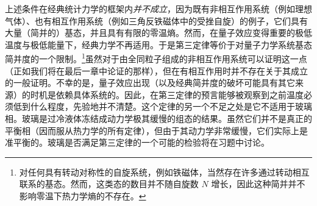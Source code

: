上述条件在经典统计力学的框架内\emph{并不成立}，因为既有非相互作用系统（例如理想气体）、也有相互作用系统（例如三角反铁磁体中的受挫自旋）的例子，它们具有大量（简并的）基态，并且具有有限的零温熵。然而，在量子效应变得重要的极低温度与极低能量下，经典力学不再适用。于是第三定律等价于对量子力学系统基态简并度的一个限制。\footnote{对任何具有转动对称性的自旋系统，例如铁磁体，当然存在许多通过转动相互联系的基态。然而，这类态的数目并不随自旋数 $N$ 增长，因此这种简并并不影响零温下热力学熵的不存在。}虽然对于由全同粒子组成的非相互作用系统可以证明这一点（正如我们将在最后一章中论证的那样），但在有相互作用时并不存在关于其成立的一般证明。不幸的是，量子效应出现（以及经典简并度的破坏可能具有其它来源）的时机是依赖具体系统的。因此，在第三定律的预言能够被观察到之前温度必须低到什么程度，先验地并不清楚。这个定律的另一个不足之处是它不适用于玻璃相。玻璃是过冷液体冻结成动力学极其缓慢的组态的结果。虽然它们并不是真正的平衡相（因而服从热力学的所有定律），但由于其动力学非常缓慢，它们实际上是准平衡的。玻璃是否满足第三定律的一个可能的检验将在习题中讨论。

